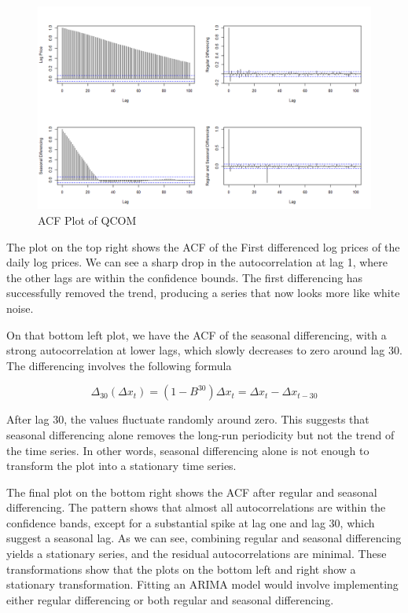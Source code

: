 \begin{figure}[h]
	\centering
	\includegraphics[width=1\linewidth]{content/plots/acf_plot_time_series.png}
	\caption{ACF Plot of QCOM }
	\label{fig:qcom_acf_plots}
\end{figure}

The plot on the top right shows the ACF of the First differenced log prices of the daily log prices. We can see a sharp drop in the autocorrelation at lag 1, where the other lags are within the confidence bounds. The first differencing has successfully removed the trend, producing a series that now looks more like white noise. 

On that bottom left plot, we have the ACF of the seasonal differencing, with a strong autocorrelation at lower lags, which slowly decreases to zero around lag 30. The differencing involves the following formula

\begin{equation}
	\Delta_{30}(\Delta x_t)=(1-B^{30})\Delta x_t=\Delta x_t-\Delta x_{t-30}
\end{equation}

After lag 30, the values fluctuate randomly around zero. This suggests that seasonal differencing alone removes the long-run periodicity but not the trend of the time series. In other words, seasonal differencing alone is not enough to transform the plot into a stationary time series.

The final plot on the bottom right shows the ACF after regular and seasonal differencing. The pattern shows that almost all autocorrelations are within the confidence bands, except for a substantial spike at lag one and lag 30, which suggest a seasonal lag. As we can see, combining regular and seasonal differencing yields a stationary series, and the residual autocorrelations are minimal. These transformations show that the plots on the bottom left and right show a stationary transformation. Fitting an ARIMA model would involve implementing either regular differencing or both regular and seasonal differencing.